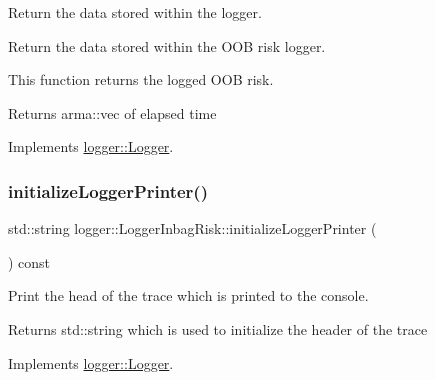 Return the data stored within the logger. 

Return the data stored within the O\+OB risk logger.

This function returns the logged O\+OB risk.

\begin{DoxyReturn}{Returns}
{\ttfamily arma\+::vec} of elapsed time 
\end{DoxyReturn}


Implements \mbox{\hyperlink{classlogger_1_1_logger_aa4fc254c532172db3404b7c0bcd17092}{logger\+::\+Logger}}.

\mbox{\label{classlogger_1_1_logger_inbag_risk_a17caab25f28cc05d9170c8ac2d910487}} 
\subsubsection{\texorpdfstring{initialize\+Logger\+Printer()}{initializeLoggerPrinter()}}
{\footnotesize\ttfamily std\+::string logger\+::\+Logger\+Inbag\+Risk\+::initialize\+Logger\+Printer (\begin{DoxyParamCaption}{ }\end{DoxyParamCaption}) const\hspace{0.3cm}{\ttfamily [virtual]}}



Print the head of the trace which is printed to the console. 

\begin{DoxyReturn}{Returns}
{\ttfamily std\+::string} which is used to initialize the header of the trace 
\end{DoxyReturn}


Implements \mbox{\hyperlink{classlogger_1_1_logger_a825f96e8564ac4013ff09ef842c0aeec}{logger\+::\+Logger}}.

\mbox{\label{classlogger_1_1_logger_inbag_risk_aa7cb90600de663c51feaaf8a0715a0f9}} 
